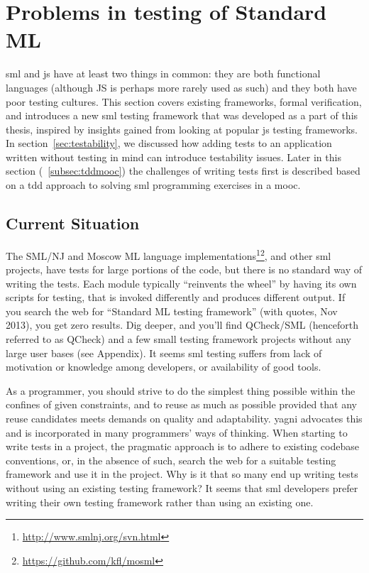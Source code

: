 \documentclass[11pt]{article}
\begin{document}
\section{Problems in testing of Standard ML}
\label{sec:smlproblems}

\Gls{sml} and \gls{js} have at least two things in common: they are both functional languages (although JS is perhaps more rarely used as such) and they both have poor testing cultures. This section covers existing frameworks, formal verification, and introduces a new \gls{sml} testing framework that was developed as a part of this thesis, inspired by insights gained from looking at popular \gls{js} testing frameworks. In section~\ref{sec:testability}, we discussed how adding tests to an application written without testing in mind can introduce testability issues. Later in this section (~\ref{subsec:tddmooc}) the challenges of writing tests first is described based on a \gls{tdd} approach to solving \gls{sml} programming exercises in a \gls{mooc}.

\subsection{Current Situation}

The SML/NJ and Moscow ML language implementations\footnote{\url{http://www.smlnj.org/svn.html}}\footnote{\url{https://github.com/kfl/mosml}}, and other \gls{sml} projects, have tests for large portions of the code, but there is no standard way of writing the tests. Each module typically ``reinvents the wheel'' by having its own scripts for testing, that is invoked differently and produces different output. If you search the web for ``Standard ML testing framework'' (with quotes, Nov 2013), you get zero results. Dig deeper, and you'll find QCheck/SML (henceforth referred to as QCheck) and a few small testing framework projects without any large user bases (see Appendix). It seems \gls{sml} testing suffers from lack of motivation or knowledge among developers, or availability of good tools. %

As a programmer, you should strive to do the simplest thing possible within the confines of given constraints, and to reuse as much as possible provided that any reuse candidates meets demands on quality and adaptability. \Gls{yagni} advocates this and is incorporated in many programmers' ways of thinking. When starting to write tests in a project, the pragmatic approach is to adhere to existing codebase conventions, or, in the absence of such, search the web for a suitable testing framework and use it in the project. Why is it that so many end up writing tests without using an existing testing framework? It seems that \gls{sml} developers prefer writing their own testing framework rather than using an existing one.
\end{document}
